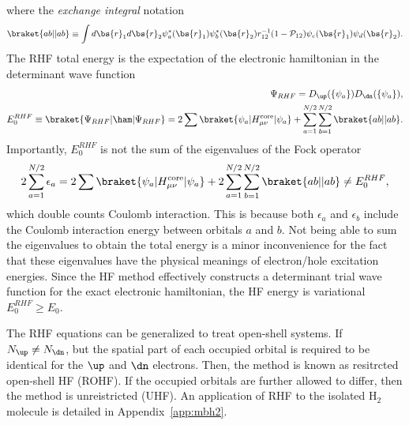 where the \textit{exchange integral} notation
\begin{align}
\braket{ab||ab} \equiv \int d\bs{r}_1d\bs{r}_2 \psi_a^*(\bs{r}_1)\psi_b^*(\bs{r}_2)r_{12}^{-1}(1-\mathcal{P}_{12})\psi_c(\bs{r}_1)\psi_d(\bs{r}_2).
\end{align}
The RHF total energy is the expectation of the electronic hamiltonian in the determinant wave function
\begin{align}
\Psi_{RHF} = D_{\up}(\{\psi_a\}) D_{\dn}(\{\psi_a\}), \\
E^{RHF}_0 \equiv \braket{\Psi_{RHF}|\ham|\Psi_{RHF}} = 2\sum\limits\braket{\psi_a|\hcore|\psi_a} + \sum\limits_{a=1}^{N/2}\sum\limits_{b=1}^{N/2} \braket{ab||ab}.
\end{align}
Importantly, $E^{RHF}_0$ is not the sum of the eigenvalues of the Fock operator
\begin{align} \label{eq:hf-esum}
2\sum\limits_{a=1}^{N/2} \epsilon_a = 2\sum\limits\braket{\psi_a|\hcore|\psi_a} + 2\sum\limits_{a=1}^{N/2}\sum\limits_{b=1}^{N/2} \braket{ab||ab} \neq E^{RHF}_0,
\end{align}
which double counts Coulomb interaction. This is because both $\epsilon_a$ and $\epsilon_b$ include the Coulomb interaction energy between orbitals $a$ and $b$.
Not being able to sum the eigenvalues to obtain the total energy is a minor inconvenience for the fact that these eigenvalues have the physical meanings of electron/hole excitation energies.
Since the HF method effectively constructs a determinant trial wave function for the exact electronic hamiltonian, the HF energy is variational $E^{RHF}_0 \ge E_0$.

The RHF equations can be generalized to treat open-shell systems.
If $N_{\up} \neq N_{\dn}$, but the spatial part of each occupied orbital is required to be identical for the $\up$ and $\dn$ electrons. Then, the method is known as resitrcted open-shell HF (ROHF).
If the occupied orbitals are further allowed to differ, then the method is unreistricted (UHF).
An application of RHF to the isolated H$_2$ molecule is detailed in Appendix~\ref{app:mbh2}.

